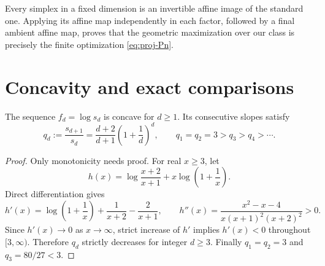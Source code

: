 Every simplex in a fixed dimension is an invertible affine image of
the standard one. Applying its affine map independently in each
factor, followed by a final ambient affine map, proves that the
geometric maximization over our class is precisely the finite
optimization \eqref{eq:proj-Pn}.

\section{Concavity and exact comparisons}

\begin{lemma}\label{lem:proj-concavity}
The sequence $f_d=\log s_d$ is concave for $d\ge1$.
Its consecutive slopes satisfy
\[
 q_d:=\frac{s_{d+1}}{s_d}
   =\frac{d+2}{d+1}\left(1+\frac1d\right)^d,
 \qquad q_1=q_2=3>q_3>q_4>\cdots.
\]
\end{lemma}

\begin{proof}
Only monotonicity needs proof. For real $x\ge3$, let
\[
 h(x)=\log\frac{x+2}{x+1}
          +x\log\left(1+\frac1x\right).
\]
Direct differentiation gives
\[
 h'(x)=\log\left(1+\frac1x\right)
                   +\frac1{x+2}-\frac2{x+1},
 \qquad
 h''(x)=\frac{x^2-x-4}{x(x+1)^2(x+2)^2}>0.
\]
Since $h'(x)\to0$ as $x\to\infty$, strict increase of $h'$ implies
$h'(x)<0$ throughout $[3,\infty)$. Therefore $q_d$ strictly decreases
for integer $d\ge3$. Finally $q_1=q_2=3$ and $q_3=80/27<3$.
\end{proof}

